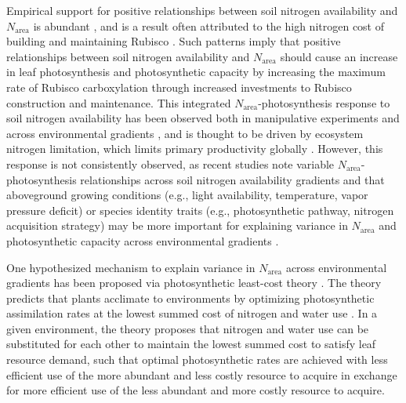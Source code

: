 Empirical support for positive relationships between soil nitrogen availability and $N_\mathrm{area}$ is abundant , and is a result often attributed to the high nitrogen cost of building and maintaining Rubisco . Such patterns imply that positive relationships between soil nitrogen availability and $N_\mathrm{area}$ should cause an increase in leaf photosynthesis and photosynthetic capacity by increasing the maximum rate of Rubisco carboxylation through increased investments to Rubisco construction and maintenance. This integrated $N_\mathrm{area}$-photosynthesis response to soil nitrogen availability has been observed both in manipulative experiments and across environmental gradients , and is thought to be driven by ecosystem nitrogen limitation, which limits primary productivity globally . However, this response is not consistently observed, as recent studies note variable $N_\mathrm{area}$-photosynthesis relationships across soil nitrogen availability gradients  and that aboveground growing conditions (e.g., light availability, temperature, vapor pressure deficit) or species identity traits (e.g., photosynthetic pathway, nitrogen acquisition strategy) may be more important for explaining variance in $N_\mathrm{area}$ and photosynthetic capacity across environmental gradients .

One hypothesized mechanism to explain variance in $N_\mathrm{area}$ across environmental gradients has been proposed via photosynthetic least-cost theory . The theory predicts that plants acclimate to environments by optimizing photosynthetic assimilation rates at the lowest summed cost of nitrogen and water use . In a given environment, the theory proposes that nitrogen and water use can be substituted for each other to maintain the lowest summed cost to satisfy leaf resource demand, such that optimal photosynthetic rates are achieved with less efficient use of the more abundant and less costly resource to acquire in exchange for more efficient use of the less abundant and more costly resource to acquire. 

